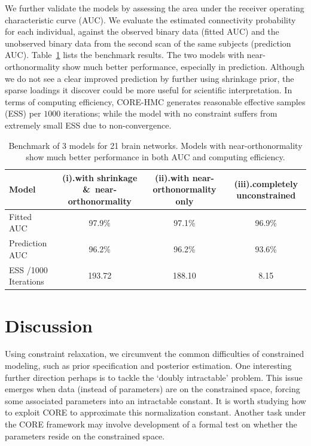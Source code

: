 \documentclass[10pt,fleqn]{article} \pdfoutput=1
\DeclareMathOperator{\1}{\mathbbm{1}} \DeclareMathOperator{\bigO}{\mc O}
\begin{document}
We further validate the models by assessing the area under the receiver operating characteristic curve (AUC). We evaluate the estimated connectivity probability for each individual, against the observed binary data (fitted AUC) and the unobserved binary data from the second scan of the same subjects (prediction AUC). Table~\ref{network_model} lists the benchmark results. The two models with near-orthonormality show much better performance, especially in prediction. Although we do not see a clear improved prediction by further using shrinkage prior, the sparse loadings it discover could be more useful for scientific interpretation. In terms of computing efficiency, CORE-HMC generates reasonable effective samples (ESS) per $1000$ iterations; while the model with no constraint suffers from extremely small ESS due to non-convergence.

\begin{table}[H] \begin{center} \tiny
		\begin{tabular}{ l| c | c| c } \hline     Model & (i).with
			shrinkage \&\ near-orthonormality     & (ii).with  near-orthonormality
			only                             & (iii).completely unconstrained                         \\         \hline
			Fitted AUC                       & 97.9\%                    & 97.1\% & 96.9\% \\ \hline
			Prediction AUC                   & 96.2\%                    & 96.2\% & 93.6\% \\ \hline ESS /1000
			Iterations                       & 193.72                    & 188.10 & 8.15   \\ \hline\end{tabular}
	\end{center} \caption{Benchmark of 3 models for 21 brain networks. Models with near-orthonormality show much better performance in both AUC and computing efficiency.
		\label{network_model}} \end{table}




\section{Discussion}

Using  constraint relaxation, we circumvent the common difficulties of constrained modeling, such as prior specification and posterior estimation.
One interesting further direction perhaps is to tackle the  `doubly
intractable' problem. This issue emerges when data (instead of parameters) are on the constrained space, forcing some associated parameters into an intractable constant. It is worth studying how to exploit CORE to approximate this normalization constant. Another task under the CORE framework may involve development of a formal test on whether the parameters reside on the constrained space.
\end{document}
